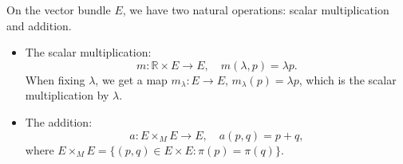 On the vector bundle $E$, we have two natural operations: scalar multiplication and addition. 
\begin{itemize}
    \item The scalar multiplication: 
    \begin{equation*}
        m: \mathbb{R} \times E \to E, \quad m(\lambda,p) = \lambda p.
    \end{equation*}
    When fixing $\lambda$, we get a map $m_\lambda: E \to E,\, m_\lambda(p) = \lambda p$, 
    which is the scalar multiplication by $\lambda$.
    \item The addition:
    \begin{equation*}
        a: E\times_M E \to E, \quad a(p,q) = p + q,
    \end{equation*}
    where $E\times_M E = \{(p,q)\in E\times E: \pi(p) = \pi(q)\}$. 
\end{itemize}

